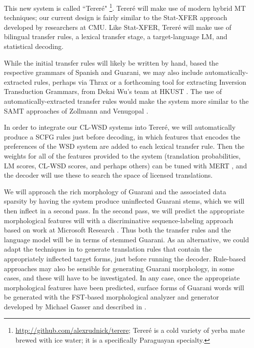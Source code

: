 This new system is called ``Tereré"
\footnote{\url{http://github.com/alexrudnick/terere}; 
Tereré is a cold variety of yerba mate brewed with ice water; it is a
specifically Paraguayan specialty.}.
Tereré will make use of modern hybrid MT techniques; our current design is
fairly similar to the Stat-XFER approach \cite{DBLP:conf/cicling/Lavie08}
developed by researchers at CMU.
Like Stat-XFER, Tereré will make use of bilingual transfer rules, a lexical
transfer stage, a target-language LM, and statistical decoding.

While the initial transfer rules will likely be written by hand, based the
respective grammars of Spanish and Guarani, we may also include
automatically-extracted rules, perhaps via Thrax \cite{weese-EtAl:2011:WMT} or
a forthcoming tool for extracting Inversion Transduction Grammars, from Dekai
Wu's team at HKUST \cite{saers-addanki-wu:2013:HyTra}.
The use of automatically-extracted transfer rules would make the system more
similar to the SAMT approaches of Zollmann and Venugopal
\cite{zollmann-venugopal:2006:WMT}.

In order to integrate our CL-WSD systems into Tereré, we will automatically
produce a SCFG rules just before decoding, in which features that encodes the
preferences of the WSD system are added to each lexical transfer rule. Then
the weights for all of the features provided to the system (translation
probabilities, LM scores, CL-WSD scores, and perhaps others) can be tuned with
MERT \cite{och:2003:ACL}, and the decoder will use these to search the space of
licensed translations.

We will approach the rich morphology of Guarani and the associated data
sparsity by having the system produce uninflected Guarani stems, which we will
then inflect in a second pass.
In the second pass, we will predict the appropriate morphological features will
with a discriminative sequence-labeling approach based on work at Microsoft
Research \cite{toutanova-suzuki-ruopp:2008:ACLMain}.
Thus both the transfer rules and the language model will be in terms of stemmed
Guarani.
As an alternative, we could adapt the techniques in
\cite{chahuneau:2013:emnlp} to generate translation rules that contain the
appropriately inflected target forms, just before running the decoder.
Rule-based approaches may also be sensible for generating Guarani morphology,
in some cases, and these will have to be investigated. In any case, once the
appropriate morphological features have been predicted, surface forms of
Guarani words will be generated with the FST-based morphological analyzer and
generator developed by Michael Gasser and described in
\cite{rudnick-gasser:2013:HyTra-2013}.

